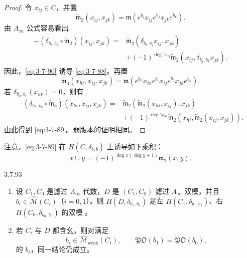 \begin{proof}
令 $x_{ij}\in C$，并置
\begin{equation}
 \widetilde{\mathfrak m}_2(x_{ij},x_{jk})
 =
 \mathfrak m(e^{b_i}x_{ij}e^{b_j}x_{jk}e^{b_k}).
\tag{3.7.90}\label{eq:3-7-90}
\end{equation}
由 $A_\infty$ 公式容易看出
\begin{equation}
\begin{aligned}
 -(\delta_{b_i,b_k}\circ\widetilde{\mathfrak m}_2)
 (x_{ij},x_{jk})
 ={}&
 \widetilde{\mathfrak m}_2(\delta_{b_i,b_j}x_{ij},x_{jk})\\
 &+(-1)^{\deg' x_{ij}}
 \widetilde{\mathfrak m}_2(x_{ij},\delta_{b_j,b_k}x_{jk}).
\end{aligned}
\tag{3.7.91}\label{eq:3-7-91}
\end{equation}
因此，\eqref{eq:3-7-90} 诱导 \eqref{eq:3-7-88}。再置
\[
 \widetilde{\mathfrak m}_3(x_{hi},x_{ij},x_{jk})
 =
 \mathfrak m(
 e^{b_h}x_{hi}e^{b_i}x_{ij}e^{b_j}x_{jk}e^{b_k}).
\]
若 $\delta_{b_u,b_v}(x_{uv})=0$，则有
\[
\begin{aligned}
 -(\delta_{b_h,b_k}\circ\widetilde{\mathfrak m}_3)
 (x_{hi},x_{ij},x_{jk})
 ={}&
 \widetilde{\mathfrak m}_2(
   \widetilde{\mathfrak m}_2(x_{hi},x_{ij}),x_{jk})\\
 &+(-1)^{\deg' x_{hi}}
 \widetilde{\mathfrak m}_2(
   x_{hi},\widetilde{\mathfrak m}_2(x_{ij},x_{jk})).
\end{aligned}
\]
由此得到 \eqref{eq:3-7-89}。弱版本的证明相同。
\end{proof}

注意，\eqref{eq:3-7-89} 在 $H(C,\delta_{b,b})$ 上诱导如下乘积：
\begin{equation}
 x\cup y
 =
 (-1)^{\deg x(\deg y+1)}\mathfrak m_2(x,y).
\tag{3.7.92}\label{eq:3-7-92}
\end{equation}

\begin{proposition}{3.7.93}\label{prop:3-7-93}
\begin{enumerate}[label=\textup{(\arabic*)},leftmargin=2.8em]
 \item 设 $C_1,C_0$ 是滤过 $A_\infty$ 代数，$D$ 是
 $(C_1,C_0)$ 滤过 $A_\infty$ 双模，并且
 $b_i\in\widehat{\mathcal M}(C_i)$（$i=0,1$）。则
 $H(D,\delta_{b_1,b_0})$ 是左
 $H(C_1,\delta_{b_1,b_1})$、右
 $H(C_0,\delta_{b_0,b_0})$ 的双模
 。

 \item 若 $C_i$ 与 $D$ 都含幺，则对满足
 \[
  b_i\in\widehat{\mathcal M}_{\mathrm{weak}}(C_i),
  \qquad
  \mathfrak{PO}(b_1)=\mathfrak{PO}(b_0),
 \]
 的 $b_i$，同一结论仍成立。
\end{enumerate}
\end{proposition}

